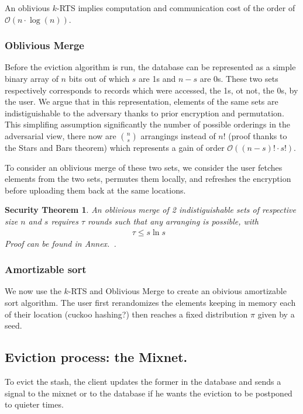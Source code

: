 \documentclass[a4paper]{article}
\newtheorem{secthm}{Security Theorem}
\begin{document}
An oblivious $k$-RTS implies computation and communication cost of the order of $\mathcal{O} \left(n\cdot \log(n)\right)$.

\subsubsection{Oblivious Merge}
Before the eviction algorithm is run, the database can be represented as a simple binary array of $n$ bits out of which $s$ are 1s and $n-s$ are 0s. These two sets respectively corresponds to records which were accessed, the 1s, ot not, the 0s, by the user.
We argue that in this representation, elements of the same sets are indistiguishable to the adversary thanks to prior encryption and permutation. This simplifing assumption significantly the number of possible orderings in the adversarial view, there now are ${n \choose s}$ arrangings instead of $n!$ (proof thanks to the Stars and Bars theorem) which represents a gain of order $\mathcal{O}\left ( (n-s)!\cdot s!\right )$.

To consider an oblivious merge of these two sets, we consider the user fetches elements from the two sets, permutes them locally, and refreshes the encryption before uploading them back at the same locations.

\begin{secthm}
An oblivious merge of 2 indistiguishable sets of respective size $n$ and $s$ requires $\tau$ rounds such that any arranging is possible, with
\begin{align*}
\tau \leq s \ln{s}&
\end{align*}
Proof can be found in Annex.~\cite{}.
\end{secthm}

\subsubsection{Amortizable sort}

We now use the $k$-RTS and Oblivious Merge to create an obivious amortizable sort algorithm.
The user first rerandomizes the elements keeping in memory each of their location (cuckoo hashing?) then reaches a fixed distribution $\pi$ given by a seed.

\subsection{Eviction process: the Mixnet.}
To evict the stash, the client updates the former in the database and sends a signal to the mixnet or to the database if he wants the eviction to be postponed to quieter times.
\end{document}
